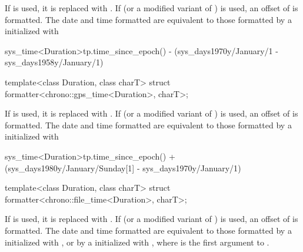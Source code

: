 \begin{itemdescr}
\pnum
\remarks
If  is used,
it is replaced with .
If  (or a modified variant of ) is used,
an offset of  is formatted.
The date and time formatted are equivalent to
those formatted by a  initialized with
\begin{codeblock}
sys_time<Duration>{tp.time_since_epoch()} -
  (sys_days{1970y/January/1} - sys_days{1958y/January/1})
\end{codeblock}
\end{itemdescr}

%
\begin{itemdecl}
template<class Duration, class charT>
  struct formatter<chrono::gps_time<Duration>, charT>;
\end{itemdecl}

\begin{itemdescr}
\pnum
\remarks
If  is used,
it is replaced with .
If  (or a modified variant of ) is used,
an offset of  is formatted.
The date and time formatted are equivalent to
those formatted by a  initialized with
\begin{codeblock}
sys_time<Duration>{tp.time_since_epoch()} +
  (sys_days{1980y/January/Sunday[1]} - sys_days{1970y/January/1})
\end{codeblock}
\end{itemdescr}

%
\begin{itemdecl}
template<class Duration, class charT>
  struct formatter<chrono::file_time<Duration>, charT>;
\end{itemdecl}

\begin{itemdescr}
\pnum
\remarks
If  is used,
it is replaced with .
If  (or a modified variant of ) is used,
an offset of  is formatted.
The date and time formatted are equivalent to
those formatted
by a  initialized with , or
by a  initialized with ,
where  is the first argument to .
\end{itemdescr}

